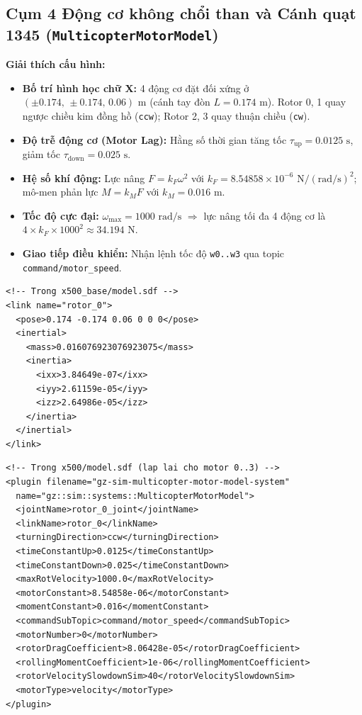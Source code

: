\documentclass[11pt,a4paper]{article}
\begin{document}
\subsection{Cụm 4 Động cơ không chổi than và Cánh quạt 1345 (\texttt{MulticopterMotorModel})}
\noindent
\begin{minipage}[t]{0.45\textwidth}
\vspace{0pt}
\textbf{Giải thích cấu hình:}
\begin{itemize}
    \item \textbf{Bố trí hình học chữ X:} 4 động cơ đặt đối xứng ở $(\pm 0.174,\, \pm 0.174,\, 0.06)\text{ m}$ (cánh tay đòn $L = 0.174\text{ m}$). Rotor 0, 1 quay ngược chiều kim đồng hồ (\texttt{ccw}); Rotor 2, 3 quay thuận chiều (\texttt{cw}).
    \item \textbf{Độ trễ động cơ (Motor Lag):} Hằng số thời gian tăng tốc $\tau_{\text{up}} = 0.0125\text{ s}$, giảm tốc $\tau_{\text{down}} = 0.025\text{ s}$.
    \item \textbf{Hệ số khí động:} Lực nâng $F = k_F \omega^2$ với $k_F = 8.54858 \times 10^{-6}\text{ N}/(\text{rad/s})^2$; mô-men phản lực $M = k_M F$ với $k_M = 0.016\text{ m}$.
    \item \textbf{Tốc độ cực đại:} $\omega_{\max} = 1000\text{ rad/s}$ $\Rightarrow$ lực nâng tối đa 4 động cơ là $4 \times k_F \times 1000^2 \approx 34.194\text{ N}$.
    \item \textbf{Giao tiếp điều khiển:} Nhận lệnh tốc độ \texttt{w0..w3} qua topic \texttt{command/motor\_speed}.
\end{itemize}
\end{minipage}
\hfill
\begin{minipage}[t]{0.52\textwidth}
\vspace{0pt}
\begin{lstlisting}[language=SDF, firstnumber=341]
<!-- Trong x500_base/model.sdf -->
<link name="rotor_0">
  <pose>0.174 -0.174 0.06 0 0 0</pose>
  <inertial>
    <mass>0.016076923076923075</mass>
    <inertia>
      <ixx>3.84649e-07</ixx>
      <iyy>2.61159e-05</iyy>
      <izz>2.64986e-05</izz>
    </inertia>
  </inertial>
</link>
\end{lstlisting}
\vspace{0.4em}
\begin{lstlisting}[language=SDF, firstnumber=7]
<!-- Trong x500/model.sdf (lap lai cho motor 0..3) -->
<plugin filename="gz-sim-multicopter-motor-model-system"
  name="gz::sim::systems::MulticopterMotorModel">
  <jointName>rotor_0_joint</jointName>
  <linkName>rotor_0</linkName>
  <turningDirection>ccw</turningDirection>
  <timeConstantUp>0.0125</timeConstantUp>
  <timeConstantDown>0.025</timeConstantDown>
  <maxRotVelocity>1000.0</maxRotVelocity>
  <motorConstant>8.54858e-06</motorConstant>
  <momentConstant>0.016</momentConstant>
  <commandSubTopic>command/motor_speed</commandSubTopic>
  <motorNumber>0</motorNumber>
  <rotorDragCoefficient>8.06428e-05</rotorDragCoefficient>
  <rollingMomentCoefficient>1e-06</rollingMomentCoefficient>
  <rotorVelocitySlowdownSim>40</rotorVelocitySlowdownSim>
  <motorType>velocity</motorType>
</plugin>
\end{lstlisting}
\end{minipage}
\end{document}
